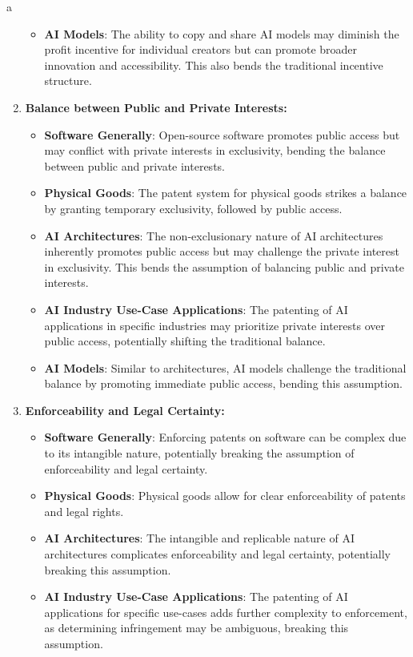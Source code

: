 a\documentclass{article}[10pt]
\begin{document}
\begin{enumerate}
\begin{itemize}
    	\item \textbf{AI Models}: The ability to copy and share AI models may diminish the profit incentive for individual creators but can promote broader innovation and accessibility. This also bends the traditional incentive structure.
    \end{itemize}
    \item \textbf{Balance between Public and Private Interests:}
    \begin{itemize}
    	\item \textbf{Software Generally}: Open-source software promotes public access but may conflict with private interests in exclusivity, bending the balance between public and private interests.
    	\item \textbf{Physical Goods}: The patent system for physical goods strikes a balance by granting temporary exclusivity, followed by public access.
    	\item \textbf{AI Architectures}: The non-exclusionary nature of AI architectures inherently promotes public access but may challenge the private interest in exclusivity. This bends the assumption of balancing public and private interests.
    	\item \textbf{AI Industry Use-Case Applications}: The patenting of AI applications in specific industries may prioritize private interests over public access, potentially shifting the traditional balance.
    	\item \textbf{AI Models}: Similar to architectures, AI models challenge the traditional balance by promoting immediate public access, bending this assumption.
    \end{itemize}
    \item \textbf{Enforceability and Legal Certainty:}
    \begin{itemize}
    	\item \textbf{Software Generally}: Enforcing patents on software can be complex due to its intangible nature, potentially breaking the assumption of enforceability and legal certainty.
    	\item \textbf{Physical Goods}: Physical goods allow for clear enforceability of patents and legal rights.
    	\item \textbf{AI Architectures}: The intangible and replicable nature of AI architectures complicates enforceability and legal certainty, potentially breaking this assumption.
    	\item \textbf{AI Industry Use-Case Applications}: The patenting of AI applications for specific use-cases adds further complexity to enforcement, as determining infringement may be ambiguous, breaking this assumption.

\end{itemize}
\end{enumerate}
\end{document}
